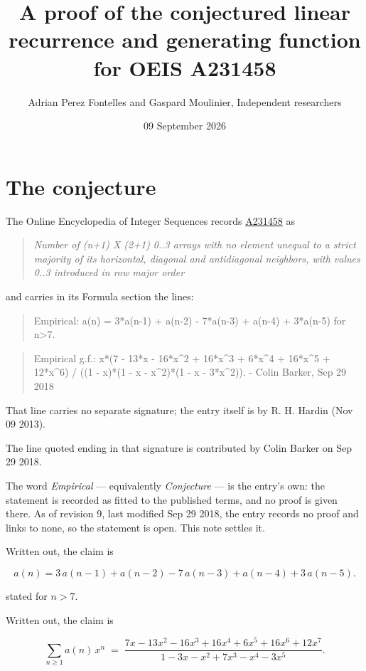 \documentclass[11pt]{article}
\title{A proof of the conjectured linear recurrence and generating function for OEIS A231458}
\author{Adrian Perez Fontelles and Gaspard Moulinier, Independent researchers}
\date{09 September 2026}
\theoremstyle{definition}
\begin{document}
\maketitle
\section{The conjecture}

The Online Encyclopedia of Integer Sequences records \href{https://oeis.org/A231458}{A231458} as

\begin{quote}\itshape Number of (n+1) X (2+1) 0..3 arrays with no element unequal to a strict majority of its horizontal, diagonal and antidiagonal neighbors, with values 0..3 introduced in row major order\end{quote}

and carries in its Formula section the lines:

\begin{quote}\ttfamily Empirical: a(n) = 3*a(n-1) + a(n-2) - 7*a(n-3) + a(n-4) + 3*a(n-5) for n>7.\end{quote}

\begin{quote}\ttfamily Empirical g.f.: x*(7 - 13*x - 16*x\textasciicircum{}2 + 16*x\textasciicircum{}3 + 6*x\textasciicircum{}4 + 16*x\textasciicircum{}5 + 12*x\textasciicircum{}6) / ((1 - x)*(1 - x - x\textasciicircum{}2)*(1 - x - 3*x\textasciicircum{}2)). - Colin Barker, Sep 29 2018\end{quote}

That line carries no separate signature; the entry itself is by R. H. Hardin (Nov 09 2013).

The line quoted ending in that signature is contributed by Colin Barker on Sep 29 2018.

The word {\itshape Empirical} --- equivalently {\itshape Conjecture} --- is the entry's own: the statement is recorded as fitted to the published terms, and no proof is given there. As of revision 9, last modified Sep 29 2018, the entry records no proof and links to none, so the statement is open. This note settles it.

Written out, the claim is

\[a(n) = 3\,a(n-1) + a(n-2) - 7\,a(n-3) + a(n-4) + 3\,a(n-5).\]

stated for $n > 7$.

Written out, the claim is

\[\sum_{n \ge 1} a(n)\,x^n \;=\; \frac{7x - 13x^{2} - 16x^{3} + 16x^{4} + 6x^{5} + 16x^{6} + 12x^{7}}{1 - 3x - x^{2} + 7x^{3} - x^{4} - 3x^{5}}.\]
\end{document}
